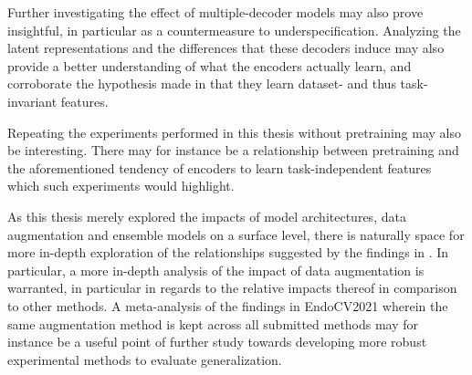 Further investigating the effect of multiple-decoder models may also prove insightful, in particular as a countermeasure to underspecification. Analyzing the latent representations and the differences that these decoders induce may also provide a better understanding of what the encoders actually learn, and corroborate the hypothesis made in  that they learn dataset- and thus task-invariant features. 

Repeating the experiments performed in this thesis without pretraining may also be interesting. There may for instance be a relationship between pretraining and the aforementioned tendency of encoders to learn task-independent features which such experiments would highlight.  

As this thesis merely explored the impacts of model architectures, data augmentation and ensemble models on a surface level, there is naturally space for more in-depth exploration of the relationships suggested by the findings in . In particular, a more in-depth analysis of the impact of data augmentation is warranted, in particular in regards to the relative impacts thereof in comparison to other methods. A meta-analysis of the findings in EndoCV2021 wherein the same augmentation method is kept across all submitted methods may for instance be a useful point of further study towards developing more robust experimental methods to evaluate generalization. 